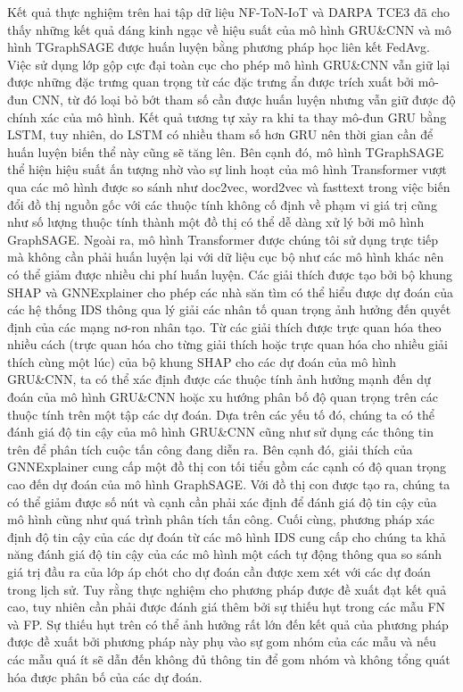 Kết quả thực nghiệm trên hai tập dữ liệu NF-ToN-IoT và DARPA TCE3 đã cho thấy những kết quả đáng kinh ngạc về hiệu suất của mô hình GRU\&CNN và mô hình TGraphSAGE được huấn luyện bằng phương pháp học liên kết FedAvg. Việc sử dụng lớp gộp cực đại toàn cục cho phép mô hình GRU\&CNN vẫn giữ lại được những đặc trưng quan trọng từ các đặc trưng ẩn được trích xuất bởi mô-đun CNN, từ đó loại bỏ bớt tham số cần được huấn luyện nhưng vẫn giữ được độ chính xác của mô hình. Kết quả tương tự xảy ra khi ta thay mô-đun GRU bằng LSTM, tuy nhiên, do LSTM có nhiều tham số hơn GRU nên thời gian cần để huấn luyện biến thể này cũng sẽ tăng lên. Bên cạnh đó, mô hình TGraphSAGE thể hiện hiệu suất ấn tượng nhờ vào sự linh hoạt của mô hình Transformer vượt qua các mô hình được so sánh như doc2vec, word2vec và fasttext trong việc biến đổi đồ thị nguồn gốc với các thuộc tính không cố định về phạm vi giá trị cũng như số lượng thuộc tính thành một đồ thị có thể dễ dàng xử lý bởi mô hình GraphSAGE. Ngoài ra, mô hình Transformer được chúng tôi sử dụng trực tiếp mà không cần phải huấn luyện lại với dữ liệu cục bộ như các mô hình khác nên có thể giảm được nhiều chi phí huấn luyện.
\bigbreak\noindent
Các giải thích được tạo bởi bộ khung SHAP và GNNExplainer cho phép các nhà săn tìm có thể hiểu được dự đoán của các hệ thống IDS thông qua lý giải các nhân tố quan trọng ảnh hưởng đến quyết định của các mạng nơ-ron nhân tạo. Từ các giải thích được trực quan hóa theo nhiều cách (trực quan hóa cho từng giải thích hoặc trực quan hóa cho nhiều giải thích cùng một lúc) của bộ khung SHAP cho các dự đoán của mô hình GRU\&CNN, ta có thể xác định được các thuộc tính ảnh hưởng mạnh đến dự đoán của mô hình GRU\&CNN hoặc xu hướng phân bố độ quan trọng trên các thuộc tính trên một tập các dự đoán. Dựa trên các yếu tố đó, chúng ta có thể đánh giá độ tin cậy của mô hình GRU\&CNN cũng như sử dụng các thông tin trên để phân tích cuộc tấn công đang diễn ra. Bên cạnh đó, giải thích của GNNExplainer cung cấp một đồ thị con tối tiểu gồm các cạnh có độ quan trọng cao đến dự đoán của mô hình GraphSAGE. Với đồ thị con được tạo ra, chúng ta có thể giảm được số nút và cạnh cần phải xác định để đánh giá độ tin cậy của mô hình cũng như quá trình phân tích tấn công. Cuối cùng, phương pháp xác định độ tin cậy của các dự đoán từ các mô hình IDS cung cấp cho chúng ta khả năng đánh giá độ tin cậy của các mô hình một cách tự động thông qua so sánh giá trị đầu ra của lớp áp chót cho dự đoán cần được xem xét với các dự đoán trong lịch sử. Tuy rằng thực nghiệm cho phương pháp được đề xuất đạt kết quả cao, tuy nhiên cần phải được đánh giá thêm bởi sự thiếu hụt trong các mẫu FN và FP. Sự thiếu hụt trên có thể ảnh hưởng rất lớn đến kết quả của phương pháp được đề xuất bởi phương pháp này phụ vào sự gom nhóm của các mẫu và nếu các mẫu quá ít sẽ dẫn đến không đủ thông tin để gom nhóm và không tổng quát hóa được phân bố của các dự đoán. 
